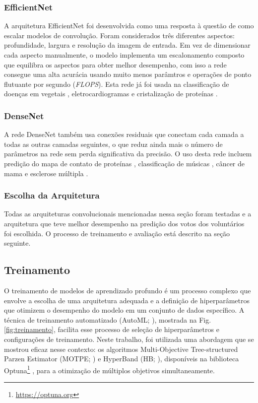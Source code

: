 \subsubsection{EfficientNet}
\label{sec:efficientnet}
A arquitetura EfficientNet \cite{EfficientNet} foi desenvolvida como uma resposta à questão de como escalar modelos de convolução. Foram considerados três diferentes aspectos: profundidade, largura e resolução da imagem de entrada. Em vez de dimensionar cada aspecto manualmente, o modelo implementa um escalonamento composto que equilibra os aspectos para obter melhor desempenho, com isso a rede consegue uma alta acurácia usando muito menos parâmtros e operações de ponto flutuante por segundo (\emph{FLOPS}). Esta rede já foi usada na classificação de doenças em vegetais \cite{EfficientNetEx03}, eletrocardiogramas \cite{EfficientNetEx01} e cristalização de proteínas \cite{EfficientNetEx02}.

\subsubsection{DenseNet}
\label{sec:densenet}
A rede DenseNet \cite{DenseNet} também usa conexões residuais que conectam cada camada a todas as outras camadas seguintes, o que reduz ainda mais o número de parâmetros na rede sem perda significativa da precisão. O uso desta rede incluem predição do mapa de contato de proteínas \cite{DenseNetEx02}, classificação de músicas \cite{DenseNetEx05}, câncer de mama \cite{DenseNetEx01} e esclerose múltipla \cite{DenseNetEx03}.


\subsubsection{Escolha da Arquitetura}
\label{sec:escolha-arch}
Todas as arquiteturas convolucionais mencionadas nessa seção foram testadas e a arquitetura que teve melhor desempenho na predição dos votos dos voluntários foi escolhida. O processo de treinamento e avaliação está descrito na seção seguinte.



\subsection{Treinamento}
\label{sec:modelo-treinamento}

O treinamento de modelos de aprendizado profundo é um processo complexo que envolve a escolha de uma arquitetura adequada e a definição de hiperparâmetros que otimizem o desempenho do modelo em um conjunto de dados específico. A técnica de treinamento automatizado (AutoML; \citealp{automl}), mostrada na Fig. \ref{fig:treinamento}, facilita esse processo de seleção de hiperparâmetros e configurações de treinamento. Neste trabalho, foi utilizada uma abordagem que se mostrou eficaz nesse contexto: os algoritmos Multi-Objective Tree-structured Parzen Estimator (MOTPE; \citealp{motpe}) e HyperBand (HB; \citealp{hyperband}), disponíveis na biblioteca Optuna\footnote{\url{https://optuna.org}} \cite{optuna}, para a otimização de múltiplos objetivos simultaneamente.

